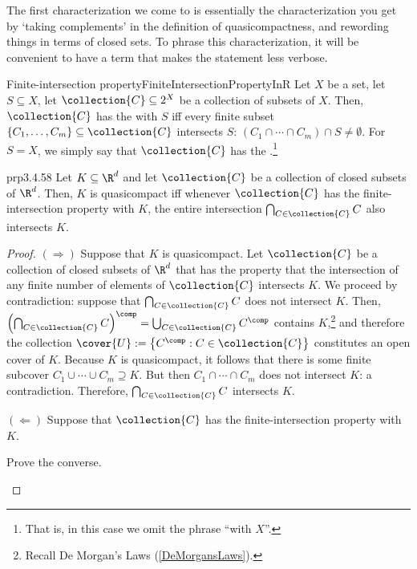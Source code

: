 The first characterization we come to is essentially the characterization you get by `taking complements' in the definition of quasicompactness, and rewording things in terms of closed sets.  To phrase this characterization, it will be convenient to have a term that makes the statement less verbose.
\begin{dfn}{Finite-intersection property}{FiniteIntersectionPropertyInR}
Let $X$ be a set, let $S\subseteq X$, let $\collection{C}\subseteq 2^X$ be a collection of subsets of $X$.  Then, $\collection{C}$ has the  with $S$ iff every finite subset $\{ C_1,\ldots ,C_m\} \subseteq \collection{C}$ intersects $S$:  $(C_1\cap \cdots \cap C_m)\cap S\neq \emptyset$.  For $S=X$, we simply say that $\collection{C}$ has the .\footnote{That is, in this case we omit the phrase ``with $X$''.}
\end{dfn}
\begin{prp}{}{prp3.4.58}
Let $K\subseteq \R ^d$ and let $\collection{C}$ be a collection of closed subsets of $\R ^d$.  Then, $K$ is quasicompact iff whenever $\collection{C}$ has the finite-intersection property with $K$, the entire intersection $\bigcap _{C\in \collection{C}}C$ also intersects $K$.
\begin{proof}
$(\Rightarrow )$ Suppose that $K$ is quasicompact.  Let $\collection{C}$ be a collection of closed subsets of $\R ^d$ that has the property that the intersection of any finite number of elements of $\collection{C}$ intersects $K$.  We proceed by contradiction:  suppose that $\bigcap _{C\in \collection{C}}C$ does not intersect $K$.  Then, $\left( \bigcap _{C\in \collection{C}}C\right) ^{\comp}=\bigcup _{C\in \collection{C}}C^{\comp}$ contains $K$,\footnote{Recall De Morgan's Laws (\cref{DeMorgansLaws}).} and therefore the collection $\cover{U}:=\left\{ C^{\comp}:C\in \collection{C}\right\}$ constitutes an open cover of $K$.  Because $K$ is quasicompact, it follows that there is some finite subcover $C_1^{\comp}\cup \cdots \cup C_m^{\comp}\supseteq K$.  But then $C_1\cap \cdots \cap C_m$ does not intersect $K$:  a contradiction.  Therefore, $\bigcap _{C\in \collection{C}}C$ intersects $K$.

\blankline
\noindent
$(\Leftarrow )$ Suppose that $\collection{C}$ has the finite-intersection property with $K$.
\begin{exr}[breakable=false]{}{}
Prove the converse.
\end{exr}
\end{proof}
\end{prp}
